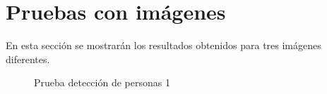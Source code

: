 \section{Pruebas con imágenes}
En esta sección se mostrarán los resultados obtenidos para tres imágenes diferentes.

\begin{figure}[H]
	\centering
	\caption{Prueba detección de personas 1}
	\label{fig:resultados1}
\end{figure}

\newpage

